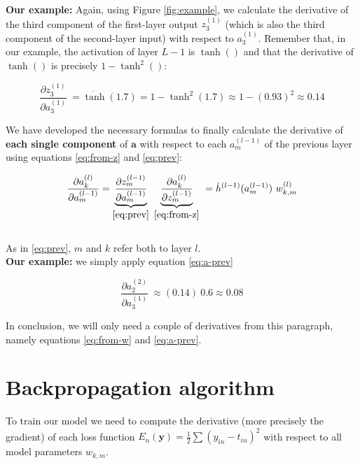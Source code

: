 \documentclass{article}
\begin{document}
\textbf{Our example:} Again, using Figure \ref{fig:example}, we calculate the derivative of the third component of the first-layer output $z_{3}^{( 1)}$ (which is also the third component of the second-layer input) with respect to $a_{3}^{( 1)}$. Remember that, in our example, the activation of layer $L-1$ is $\tanh()$ and that the derivative of $\tanh()$ is precisely $1-\tanh^2()$:

\begin{equation*}
\frac{\partial z_{3}^{( 1)}}{\partial a_{3}^{( 1)}} \ =\dot{\tanh}( 1.7) =1-\tanh^{2}( 1.7)  \approx 1-( 0.93)^{2} \approx 0.14
\end{equation*}

\begin{center}\textleaf\end{center}


We have developed the necessary formulas to finally calculate the derivative of \textbf{each single component} of $\boldsymbol{a}$ with respect to each $a_m^{(l-1)}$ of the previous layer using equations \eqref{eq:from-z} and \eqref{eq:prev}:

\begin{gather}
\frac{\partial a_{k}^{(l)} }{ \partial a_{m}^{( l-1)}}
= \underbrace{\frac{\partial z_{m}^{( l-1)}}{\partial a_{m}^{( l-1)}}}_{\eqref{eq:prev}} \
\underbrace{\frac{\partial a_{k}^{( l)}}{\partial z_{m}^{( l-1)}}}_{\eqref{eq:from-z}} \
=\dot{h}^{( l-1)}( a_{m}^{( l-1)}) \ w_{k,m}^{( l)} \label{eq:a-prev}
\end{gather}\\

As in \eqref{eq:prev}, $m$ and $k$ refer both to layer $l$.\\

\textbf{Our example:} we simply apply equation \eqref{eq:a-prev}


\begin{equation*}
\frac{\partial a_{2}^{( 2)}}{\partial a_{3}^{( 1)}} \  \approx (0.14)\ 0.6\approx 0.08
\end{equation*}

In conclusion, we will only need a couple of derivatives from this paragraph, namely equations \eqref{eq:from-w} and \eqref{eq:a-prev}.

\section{Backpropagation algorithm}
To train our model we need to compute the derivative (more precisely the gradient) of each loss function $\displaystyle E_{n}(\mathbf{y}) =\frac{1}{2}\sum ( y_{in} -t_{in})^{2}$ with respect to all model parameters $w_{k,m}$.
\end{document}
